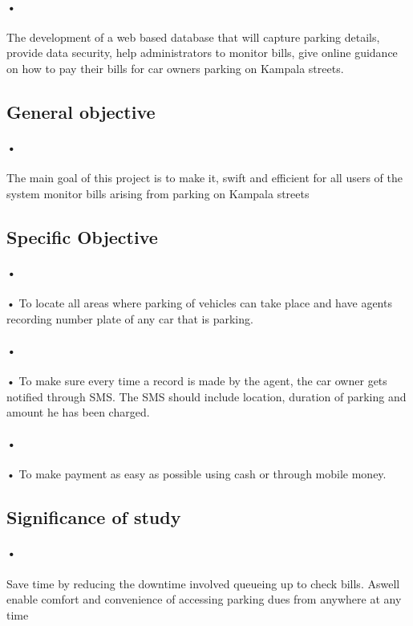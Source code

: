 \documentclass[12pt]{article}
\begin{document}
\paragraph{•}
The development of a web based database that will capture parking details, provide data security, help administrators to monitor bills, give online guidance on how to pay their bills for car owners parking on Kampala streets.

\subsection{General objective}
\paragraph{•}
The main goal of this project is to make it, swift and efficient for all users of the system monitor bills arising from parking on Kampala streets

 
\subsection{Specific Objective}
\paragraph{•}
•	To locate all areas where parking of vehicles can take place and have agents recording number plate of any car that is parking.\\
\paragraph{•}
•	To make sure every time a record is made by the agent, the car owner gets notified through SMS. The SMS should include location, duration of parking and amount he has been charged.\\
\paragraph{•}
•	To make payment as easy as possible using cash or through mobile money.

\subsection{Significance of study}
\paragraph{•}
 Save time by reducing the downtime involved queueing up to check bills. Aswell enable comfort and convenience of accessing parking dues from anywhere at any time
\end{document}

